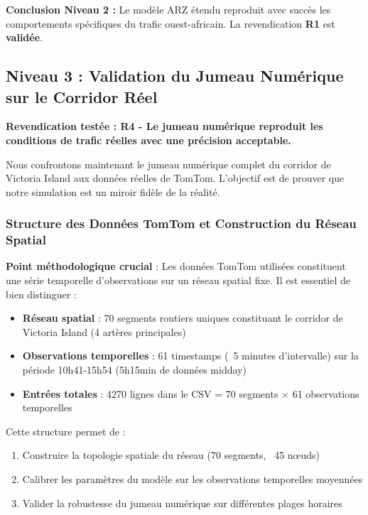 \textbf{Conclusion Niveau 2 :} Le modèle ARZ étendu reproduit avec succès les comportements spécifiques du trafic ouest-africain. La revendication \textbf{R1} est \textbf{validée}.


\subsection{Niveau 3 : Validation du Jumeau Numérique sur le Corridor Réel}
\label{sec:validation_jumeau_numerique_revised}

\textbf{Revendication testée : R4 - Le jumeau numérique reproduit les conditions de trafic réelles avec une précision acceptable.}

Nous confrontons maintenant le jumeau numérique complet du corridor de Victoria Island aux données réelles de TomTom. L'objectif est de prouver que notre simulation est un miroir fidèle de la réalité.

\subsubsection{Structure des Données TomTom et Construction du Réseau Spatial}
\label{subsec:structure_donnees_tomtom}

\textbf{Point méthodologique crucial} : Les données TomTom utilisées constituent une série temporelle d'observations sur un réseau spatial fixe. Il est essentiel de bien distinguer :
\begin{itemize}
    \item \textbf{Réseau spatial} : 70 segments routiers uniques constituant le corridor de Victoria Island (4 artères principales)
    \item \textbf{Observations temporelles} : 61 timestamps (~5 minutes d'intervalle) sur la période 10h41-15h54 (5h15min de données midday)
    \item \textbf{Entrées totales} : 4270 lignes dans le CSV = 70 segments × 61 observations temporelles
\end{itemize}

Cette structure permet de :
\begin{enumerate}
    \item Construire la topologie spatiale du réseau (70 segments, ~45 nœuds)
    \item Calibrer les paramètres du modèle sur les observations temporelles moyennées
    \item Valider la robustesse du jumeau numérique sur différentes plages horaires
\end{enumerate}

